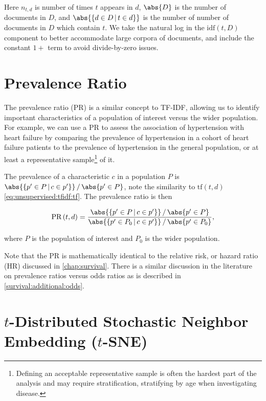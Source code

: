 \noindent Here $n_{t,d}$ is number of times $t$ appears in $d$,
$\abs{D}$ is the number of documents in $D$,
and $\abs{\left\{d \in D \, | \, t \in d\right\}}$ is the number of number of documents in $D$ which contain $t$.
We take the natural log in the $\text{idf}\left(t,D\right)$ component to better accommodate large corpora of documents,
and include the constant $1+$ term to avoid divide-by-zero issues.

\section{Prevalence Ratio}
\label{dim_reduct:prevalence_ratio}

The prevalence ratio (PR) is a similar concept to TF-IDF,
allowing us to identify important characteristics of a population of interest versus the wider population.
For example, we can use a PR to assess the association of hypertension with heart failure by comparing
the prevalence of hypertension in a cohort of heart failure patients
to the prevalence of hypertension in the general population,
or at least a representative sample\footnote{Defining an acceptable representative sample is often the hardest part of the analysis and may require stratification, \eg stratifying by age when investigating disease.} of it.

The prevalence of a characteristic $c$ in a population $P$ is $\abs{\{p' \in P \, | \, c \in p'\}} \, / \, \abs{p' \in P}$,
note the similarity to $\text{tf}\left(t,d\right)$ \cref{eq:unsupervised:tfidf:tf}.
The prevalence ratio is then

\begin{equation}\label{eq:unsupervised:PR}
\text{PR}\left(t,d\right) = \frac{ \abs{\{p' \in P \, | \, c \in p'\}} \, / \, \abs{p' \in P} }{ \abs{\{p' \in P_{0} \, | \, c \in p'\}} \, / \, \abs{p' \in P_{0}} },
\end{equation}

\noindent where $P$ is the population of interest and $P_{0}$ is the wider population.

Note that the PR is mathematically identical to the relative risk, or hazard ratio (HR) discussed in \cref{chap:survival}.
There is a similar discussion in the literature \cite{pmid27460748,10.3389/fvets.2017.00193}
on prevalence ratios versus odds ratios as is described in \cref{survival:additional:odds}.


\section{\texorpdfstring{$t$}{t}-Distributed Stochastic Neighbor Embedding (\texorpdfstring{$t$}{t}-SNE)}
\label{dim_reduct:tSNE}

